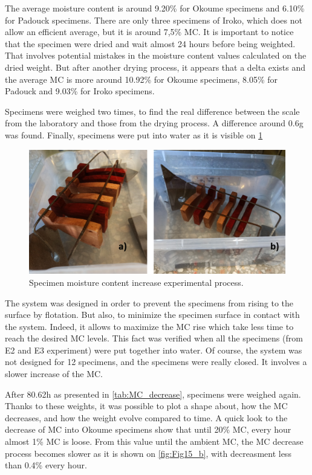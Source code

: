 The average moisture content is around 9.20\% for Okoume specimens and 6.10\% for Padouck specimens. There are only three specimens of Iroko, which does not allow an efficient average, but it is around 7,5\% MC. It is important to notice that the specimen were dried and wait almost 24 hours before being weighted. That involves potential mistakes in the moisture content values calculated on the dried weight. But after another drying process, it appears that a delta exists and the average MC is more around 10.92\% for Okoume specimens, 8.05\% for Padouck and 9.03\% for Iroko specimens.

Specimens were weighed two times, to find the real difference between the scale from the laboratory and those from the drying process. A difference around 0.6g was found. Finally, specimens were put into water as it is visible on \ref{fig:Fig13}
\begin{figure}[h]
	\includegraphics[width=\textwidth]{Figures/WaterSpecimens}
	\caption[Specimen moisture content increase]{Specimen moisture content increase experimental process.}
	\label{fig:Fig13}
\end{figure}

The system was designed in order to prevent the specimens from rising to the surface by flotation. But also, to minimize the specimen surface in contact with the system. Indeed, it allows to maximize the MC rise which take less time to reach the desired MC levels. This fact was verified when all the specimens (from E2 and E3 experiment) were put together into water. Of course, the system was not designed for 12 specimens, and the specimens were really closed. It involves a slower increase of the MC.

After 80.62h as presented in \ref{tab:MC_decrease}, specimens were weighed again. Thanks to these weights, it was possible to plot a shape about, how the MC decreases, and how the weight evolve compared to time. A quick look to the decrease of MC into Okoume specimens show that until 20\% MC, every hour almost 1\% MC is loose. From this value until the ambient MC, the MC decrease process becomes slower as it is shown on \ref{fig:Fig15_b}, with decreasment less than 0.4\% every hour.

